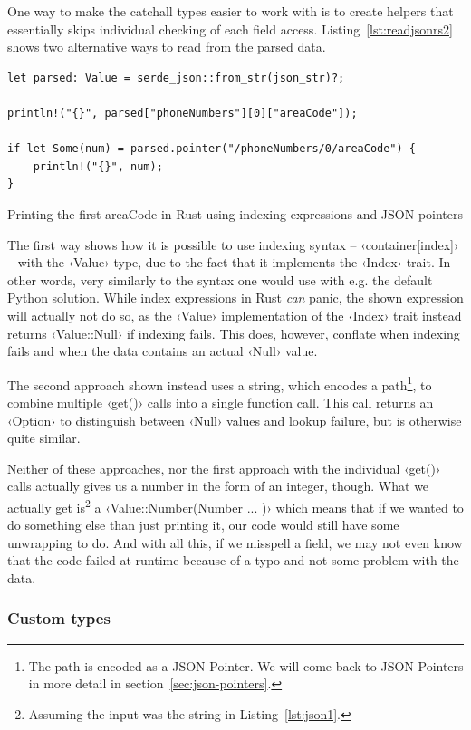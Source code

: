 One way to make the catchall types easier to work with is to create helpers that essentially skips individual checking of each field access. Listing~\ref{lst:readjsonrs2} shows two alternative ways to read from the parsed data.

\begin{listing}[ht!]
\begin{verbatim}
let parsed: Value = serde_json::from_str(json_str)?;

println!("{}", parsed["phoneNumbers"][0]["areaCode"]);

if let Some(num) = parsed.pointer("/phoneNumbers/0/areaCode") {
    println!("{}", num);
}
\end{verbatim}
\caption{Printing the first areaCode in Rust using indexing expressions and JSON pointers}
\label{lst:readjsonrs2}
\end{listing}

The first way shows how it is possible to use indexing syntax -- ‹container[index]› -- with the ‹Value› type, due to the fact that it implements the ‹Index› trait. In other words, very similarly to the syntax one would use with e.g. the default Python solution. While index expressions in Rust \emph{can} panic, the shown expression will actually not do so, as the ‹Value› implementation of the ‹Index› trait instead returns ‹Value::Null› if indexing fails. This does, however, conflate when indexing fails and when the data contains an actual ‹Null› value.

The second approach shown instead uses a string, which encodes a path\footnote{The path is encoded as a JSON Pointer. We will come back to JSON Pointers in more detail in section~\ref{sec:json-pointers}.}, to combine multiple ‹get()› calls into a single function call. This call returns an ‹Option› to distinguish between ‹Null› values and lookup failure, but is otherwise quite similar.

Neither of these approaches, nor the first approach with the individual ‹get()› calls actually gives us a number in the form of an integer, though. What we actually get is\footnote{Assuming the input was the string in Listing~\ref{lst:json1}.} a ‹Value::Number(Number { ... })› which means that if we wanted to do something else than just printing it, our code would still have some unwrapping to do. And with all this, if we misspell a field, we may not even know that the code failed at runtime because of a typo and not some problem with the data.

\subsubsection{Custom types}


